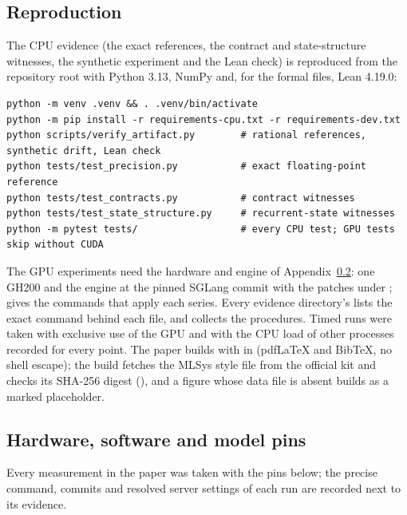 \subsection{Reproduction}\label{app:repro}
The CPU evidence (the exact references, the contract and state-structure witnesses, the synthetic experiment and the Lean check) is reproduced from the repository root with Python 3.13, NumPy and, for the formal files, Lean 4.19.0:
\par\noindent\begin{minipage}{\linewidth}
\begin{verbatim}
python -m venv .venv && . .venv/bin/activate
python -m pip install -r requirements-cpu.txt -r requirements-dev.txt
python scripts/verify_artifact.py        # rational references, synthetic drift, Lean check
python tests/test_precision.py           # exact floating-point reference
python tests/test_contracts.py           # contract witnesses
python tests/test_state_structure.py     # recurrent-state witnesses
python -m pytest tests/                  # every CPU test; GPU tests skip without CUDA
\end{verbatim}
\end{minipage}\par\smallskip
The GPU experiments need the hardware and engine of Appendix~\ref{app:pins}: one GH200 and the engine at the pinned SGLang commit with the patches under ;  gives the commands that apply each series. Every evidence directory's  lists the exact command behind each file, and  collects the procedures. Timed runs were taken with exclusive use of the GPU and with the CPU load of other processes recorded for every point. The paper builds with  in  (pdfLaTeX and BibTeX, no shell escape); the build fetches the MLSys style file from the official kit and checks its SHA-256 digest (), and a figure whose data file is absent builds as a marked placeholder.

\subsection{Hardware, software and model pins}\label{app:pins}
Every measurement in the paper was taken with the pins below; the precise command, commits and resolved server settings of each run are recorded next to its evidence.

